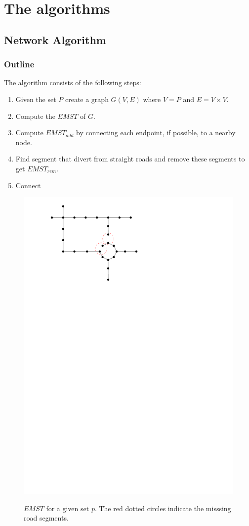 \documentclass[11pt]{article}
\begin{document}
\section{The algorithms}
\label{se:algorithms}
\subsection{Network Algorithm}
\subsubsection{Outline}
The algorithm consists of the following steps:
\begin{enumerate}
  \item Given the set $P$ create a graph $G(V,E)$ where $V=P$ and $E=V\times V$.
  \item Compute the $EMST$ of $G$.
  \item Compute $EMST_{add}$ by connecting each endpoint, if possible, to a nearby node.
  \item Find segment that divert from straight roads and remove these segments to get $EMST_{rem}$.
  \item Connect
\end{enumerate}
  \begin{figure}[h]
  \centering
      \graphicspath{ {images/}}
      \includegraphics[width=0.7\linewidth]{NetworkMST}
      \label{fig:EMST}
      \caption{$EMST$ for a given set $p$. The red dotted circles indicate the misssing road segments.}
  \end{figure}
\end{document}
